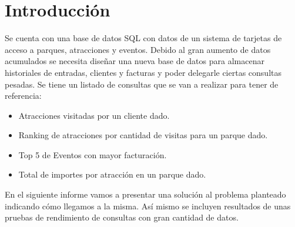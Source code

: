 \section{Introducción}

\par Se cuenta con una base de datos SQL con datos de un sistema de tarjetas de acceso a parques, atracciones y eventos.
Debido al gran aumento de datos acumulados se necesita diseñar una nueva base de datos para almacenar historiales de entradas, clientes y
facturas y poder delegarle ciertas consultas pesadas. Se tiene un listado de consultas que se van a realizar para tener de referencia:

\begin{itemize}
  \item Atracciones visitadas por un cliente dado.
  \item Ranking de atracciones por cantidad de visitas para un parque dado.
  \item Top 5 de Eventos con mayor facturación.
  \item Total de importes por atracción en un parque dado.
\end{itemize}

\par En el siguiente informe vamos a presentar una solución al problema planteado indicando cómo llegamos a la misma.
Así mismo se incluyen resultados de unas pruebas de rendimiento de consultas con gran cantidad de datos.
